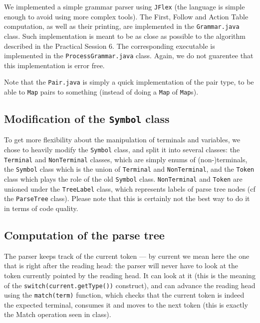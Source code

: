 \documentclass[a4paper]{scrartcl}
\begin{document}
We implemented a simple grammar parser using \texttt{JFlex} (the language is simple enough to avoid using more complex tools). The First, Follow and Action Table computation, as well as their printing, are implemented in the \texttt{Grammar.java} class. Such implementation is meant to be as close as possible to the algorithm described in the Practical Session 6. The corresponding executable is implemented in the \texttt{ProcessGrammar.java} class.
Again, we do not guarentee that this implementation is error free.

Note that the \texttt{Pair.java} is simply a quick implementation of the pair type, to be able to \texttt{Map} pairs to something (instead of doing a \texttt{Map} of \texttt{Map}s).

\subsection{Modification of the \texttt{Symbol} class}

To get more flexibility about the manipulation of terminals and variables, we chose to heavily modify the \texttt{Symbol} class, and split it into several classes: the \texttt{Terminal} and \texttt{NonTerminal} classes, which are simply enums of (non-)terminals, the \texttt{Symbol} class which is the union of \texttt{Terminal} and \texttt{NonTerminal}, and the \texttt{Token} class which plays the role of the old \texttt{Symbol} class. \texttt{NonTerminal} and \texttt{Token} are unioned under the \texttt{TreeLabel} class, which represents labels of parse tree nodes (cf the \texttt{ParseTree} class). Please note that this is certainly not the best way to do it in terms of code quality.

\subsection{Computation of the parse tree}

The parser keeps track of the current token --- by current we mean here the one that is right after the reading head: the parser will never have to look at the token currently pointed by the reading head. It can look at it (this is the meaning of the \texttt{switch(current.getType())} construct), and can advance the reading head using the \texttt{match(term)} function, which checks that the current token is indeed the expected terminal, consumes it and moves to the next token (this is exactly the Match operation seen in class).
\end{document}

